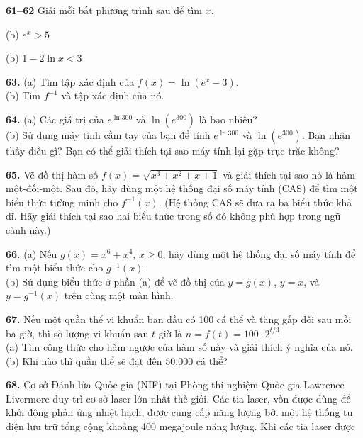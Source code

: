 \begin{minipage}[t]{0.482\textwidth}
\noindent\textbf{\textsf{\color{stewartcyan}61--62}} Giải mỗi bất phương trình sau để tìm $x$.

\medskip
\noindent
{}(b) $e^x > 5$

\smallskip
\noindent
{}(b) $1 - 2\ln x < 3$

\par\vspace{1.5mm}\noindent{\color{stewartcyan}\rule{\linewidth}{0.4pt}}\par\vspace{1.5mm}

\noindent\textbf{63.} (a) Tìm tập xác định của $f(x) = \ln(e^x - 3)$.\\
\hspace*{5.5mm}(b) Tìm $f^{-1}$ và tập xác định của nó.

\medskip
\noindent\textbf{64.} (a) Các giá trị của $e^{\ln 300}$ và $\ln(e^{300})$ là bao nhiêu?\\
\hspace*{5.5mm}(b) Sử dụng máy tính cầm tay của bạn để tính $e^{\ln 300}$ và $\ln(e^{300})$. Bạn nhận thấy điều gì? Bạn có thể giải thích tại sao máy tính lại gặp trục trặc không?

\medskip
\noindent\casicon\;\textbf{65.} Vẽ đồ thị hàm số $f(x) = \sqrt{x^3 + x^2 + x + 1}$ và giải thích tại sao nó là hàm một-đối-một. Sau đó, hãy dùng một hệ thống đại số máy tính (CAS) để tìm một biểu thức tường minh cho $f^{-1}(x)$. (Hệ thống CAS sẽ đưa ra ba biểu thức khả dĩ. Hãy giải thích tại sao hai biểu thức trong số đó không phù hợp trong ngữ cảnh này.)

\medskip
\noindent\casicon\;\textbf{66.} (a) Nếu $g(x) = x^6 + x^4$, $x \ge 0$, hãy dùng một hệ thống đại số máy tính để tìm một biểu thức cho $g^{-1}(x)$.\\
\hspace*{9.5mm}(b) Sử dụng biểu thức ở phần (a) để vẽ đồ thị của $y = g(x)$, $y = x$, và $y = g^{-1}(x)$ trên cùng một màn hình.

\medskip
\noindent\textbf{67.} Nếu một quần thể vi khuẩn ban đầu có 100 cá thể và tăng gấp đôi sau mỗi ba giờ, thì số lượng vi khuẩn sau $t$ giờ là $n = f(t) = 100 \cdot 2^{t/3}$.\\
(a) Tìm công thức cho hàm ngược của hàm số này và giải thích ý nghĩa của nó.\\
(b) Khi nào thì quần thể sẽ đạt đến $50.000$ cá thể?

\medskip
\noindent\textbf{68.} Cơ sở Đánh lửa Quốc gia (NIF) tại Phòng thí nghiệm Quốc gia Lawrence Livermore duy trì cơ sở laser lớn nhất thế giới. Các tia laser, vốn được dùng để khởi động phản ứng nhiệt hạch, được cung cấp năng lượng bởi một hệ thống tụ điện lưu trữ tổng cộng khoảng 400 megajoule năng lượng. Khi các tia laser được
\end{minipage}%

